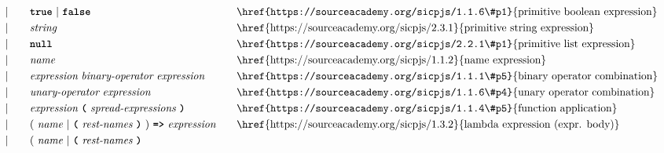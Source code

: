 \begin{alignat*}{9}
&&                       && |   &\quad && \textbf{\texttt{true}}\ |\ \textbf{\texttt{false}}
                                                           && \textrm{\href{https://sourceacademy.org/sicpjs/1.1.6\#p1}{primitive boolean expression}}\\
&&                       && |   &\quad &&  \textit{string}   && \textrm{\href{https://sourceacademy.org/sicpjs/2.3.1}{primitive string expression}} \\
&&                       && |   &\quad && \textbf{\texttt{null}}
                                                           && \textrm{\href{https://sourceacademy.org/sicpjs/2.2.1\#p1}{primitive list expression}} \\
&&                       && |   &\quad &&  \textit{name}   && \textrm{\href{https://sourceacademy.org/sicpjs/1.1.2}{name expression}} \\
&&                       && |   &\quad &&  \textit{expression} \  \textit{binary-operator} \ 
                                            \textit{expression} \qquad
                                                           && \textrm{\href{https://sourceacademy.org/sicpjs/1.1.1\#p5}{binary operator combination}} \\
&&                       && |   &\quad &&   \textit{unary-operator} \ 
                                            \textit{expression}
                                                           && \textrm{\href{https://sourceacademy.org/sicpjs/1.1.6\#p4}{unary operator combination}}\\
&&                       && |   &\quad &&   \textit{expression} \ 
                                            \textbf{\texttt{(}}\ \textit{spread-expressions}\
                                            \textbf{\texttt{)}}
                                                           && \textrm{\href{https://sourceacademy.org/sicpjs/1.1.4\#p5}{function application}} \\
&&                       && |   &\quad &&   (\ \textit{name}\ | \
                                               \textbf{\texttt{(}}\ \textit{rest-names}\ \textbf{\texttt{)}}\
                                            )\    
                                            \texttt{\textbf{=>}}\ \textit{expression}
                                                           && \textrm{\href{https://sourceacademy.org/sicpjs/1.3.2}{lambda expression (expr. body)}} \\
&&                       && |   &\quad &&   (\ \textit{name}\ | \
                                               \textbf{\texttt{(}}\ \textit{rest-names}\ \textbf{\texttt{)}}\

\end{alignat*}
